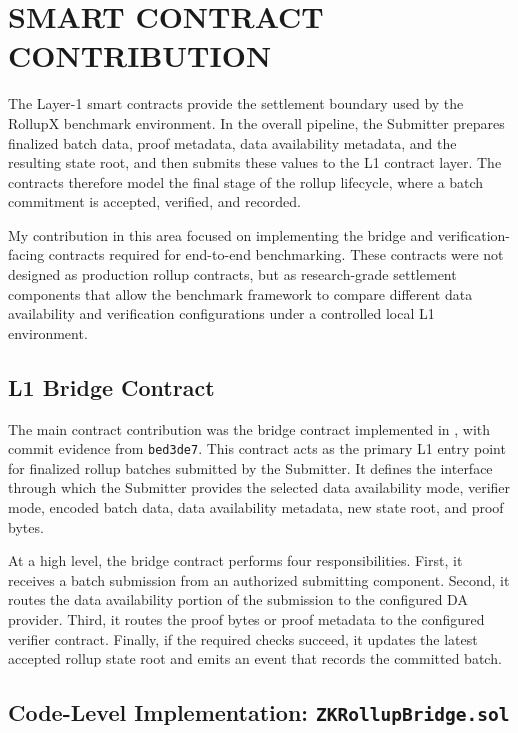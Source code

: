 \chapter{SMART CONTRACT CONTRIBUTION}

The Layer-1 smart contracts provide the settlement boundary used by the RollupX benchmark environment. In the overall pipeline, the Submitter prepares finalized batch data, proof metadata, data availability metadata, and the resulting state root, and then submits these values to the L1 contract layer. The contracts therefore model the final stage of the rollup lifecycle, where a batch commitment is accepted, verified, and recorded.

My contribution in this area focused on implementing the bridge and verification-facing contracts required for end-to-end benchmarking. These contracts were not designed as production rollup contracts, but as research-grade settlement components that allow the benchmark framework to compare different data availability and verification configurations under a controlled local L1 environment.

\section{L1 Bridge Contract}

The main contract contribution was the bridge contract implemented in , with commit evidence from \texttt{bed3de7}. This contract acts as the primary L1 entry point for finalized rollup batches submitted by the Submitter. It defines the interface through which the Submitter provides the selected data availability mode, verifier mode, encoded batch data, data availability metadata, new state root, and proof bytes.

At a high level, the bridge contract performs four responsibilities. First, it receives a batch submission from an authorized submitting component. Second, it routes the data availability portion of the submission to the configured DA provider. Third, it routes the proof bytes or proof metadata to the configured verifier contract. Finally, if the required checks succeed, it updates the latest accepted rollup state root and emits an event that records the committed batch.

\section{Code-Level Implementation: \texttt{ZKRollupBridge.sol}}

